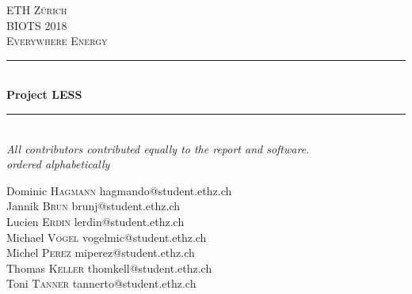 \documentclass[10pp]{article}
\begin{document}
\begin{titlepage}

\newcommand{\HRule}{\rule{\linewidth}{0.5mm}} %



\center %
 

\textsc{\LARGE ETH Zürich}\\[1.5cm] %
\textsc{\Large BIOTS 2018}\\[0.5cm] %
\textsc{\large Everywhere Energy}\\[0.5cm] %


\HRule \\[0.4cm]
{ \huge \bfseries Project LESS}\\[0.4cm] %
\HRule \\[1.5cm]
 
\emph{All contributors contributed equally to the report and software. \\ ordered alphabetically}
\vspace*{35px}

\begin{minipage}{0.8\textwidth}
\begin{flushleft} \large
Dominic \textsc{Hagmann} \hfill{} hagmando@student.ethz.ch \\
Jannik \textsc{Brun} \hfill{} brunj@student.ethz.ch \\
Lucien \textsc{Erdin} \hfill{} lerdin@student.ethz.ch \\
Michael \textsc{Vogel} \hfill{} vogelmic@student.ethz.ch \\
Michel \textsc{Perez} \hfill{} miperez@student.ethz.ch \\
Thomas \textsc{Keller} \hfill{} thomkell@student.ethz.ch \\
Toni \textsc{Tanner} \hfill{} tannerto@student.ethz.ch \\
\end{flushleft}
\end{minipage}
\vspace*{100px}


\end{titlepage}
\end{document}
